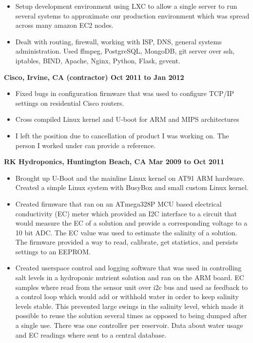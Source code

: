 \documentclass{res}
\begin{document}
\begin{resume}
\begin{itemize}
\item
	Setup  development  environment using LXC to allow a single
	server to run several systems to approximate our production
	environment which was spread across many amazon EC2 nodes.

\item
	Dealt with routing, firewall, working with ISP, DNS, general
	systems administration.  Used ffmpeg, PostgreSQL, MongoDB,
	git server over ssh, iptables, BIND, Apache, Nginx, Python,
	Flask, gevent.

\end{itemize}

{\large \bf Cisco, Irvine, CA (contractor) \hfill Oct 2011 to Jan 2012}

\begin{itemize}

\item
	Fixed bugs in configuration firmware that was used to configure
	TCP/IP settings on residential Cisco routers.
\item
	Cross compiled Linux kernel and U-boot for ARM and MIPS
	architectures
\item
	I left the position due to cancellation of product I was
	working on.  The person I worked under can provide a
	reference.

\end{itemize}

{\large \bf RK Hydroponics, Huntington Beach, CA \hfill Mar 2009 to
Oct 2011}

\begin{itemize}

\item
	Brought up U-Boot and the mainline Linux kernel on AT91 ARM
	hardware.  Created a simple Linux system with BusyBox and small
	custom Linux kernel.

\item
	Created firmware that ran on an ATmega328P MCU based electrical
	conductivity (EC) meter which provided
	an I2C interface to a circuit that would measure the 
	EC of a solution and provide a corresponding voltage
	to a 10 bit ADC.  The EC value was used to estimate the salinity of
	a solution.  The firmware provided a way to read, calibrate, get
	statistics, and persists settings to an EEPROM.

\item
	Created userspace control and logging software that was used in
	controlling salt levels in a hydroponic nutrient solution and
	ran on the ARM board.  EC samples
	where read from the sensor unit over i2c bus and used as feedback
	to a control loop which would add or withhold water in order to
	keep salinity levels stable.  This prevented large swings in the
	salinity level, which made it possible to reuse the solution
	several times as opposed to being dumped after a single use.
	There was one controller per reservoir.  Data about water usage
	and EC readings where sent to a central database.


\end{itemize}
\end{resume}
\end{document}
